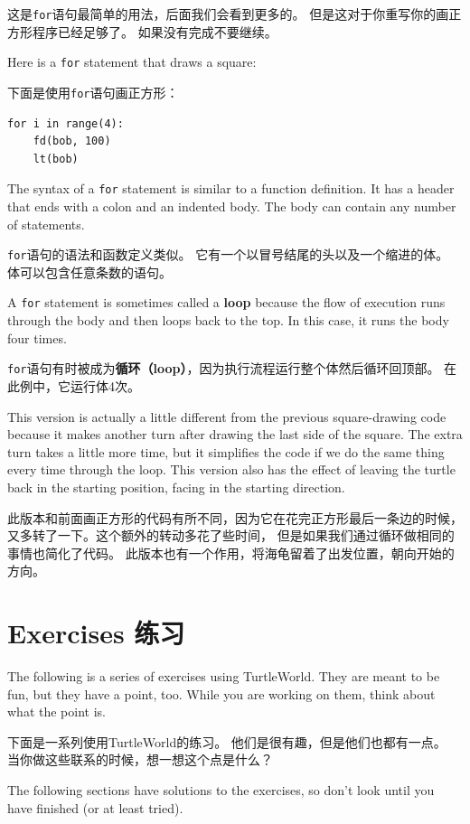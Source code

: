 \documentclass[10pt]{book}
\begin{document}
\begin{CJK}{UTF8}{gbsn}
这是{\tt for}语句最简单的用法，后面我们会看到更多的。
但是这对于你重写你的画正方形程序已经足够了。
如果没有完成不要继续。

Here is a {\tt for} statement that draws a square:

下面是使用{\tt for}语句画正方形：

\begin{verbatim}
for i in range(4):
    fd(bob, 100)
    lt(bob)
\end{verbatim}
%
The syntax of a {\tt for} statement is similar to a function
definition.  It has a header that ends with a colon and an indented
body.  The body can contain any number of statements.

{\tt for}语句的语法和函数定义类似。
它有一个以冒号结尾的头以及一个缩进的体。
体可以包含任意条数的语句。

A {\tt for} statement is sometimes called a {\bf loop} because
the flow of execution runs through the body and then loops back
to the top.  In this case, it runs the body four times.

{\tt for}语句有时被成为{\bf 循环（loop）}，因为执行流程运行整个体然后循环回顶部。
在此例中，它运行体4次。

This version is actually a little different from the previous
square-drawing code because it makes another turn after
drawing the last side of the square.  The extra turn takes a little
more time, but it simplifies the code if we do the same thing
every time through the loop.  This version also has the effect
of leaving the turtle back in the starting position, facing in
the starting direction.

此版本和前面画正方形的代码有所不同，因为它在花完正方形最后一条边的时候，
又多转了一下。这个额外的转动多花了些时间，
但是如果我们通过循环做相同的事情也简化了代码。
此版本也有一个作用，将海龟留着了出发位置，朝向开始的方向。

\section{Exercises 练习}

The following is a series of exercises using TurtleWorld.  They
are meant to be fun, but they have a point, too.  While you are
working on them, think about what the point is.

下面是一系列使用TurtleWorld的练习。
他们是很有趣，但是他们也都有一点。
当你做这些联系的时候，想一想这个点是什么？

The following sections have solutions to the exercises, so
don't look until you have finished (or at least tried).


\end{CJK}
\end{document}
